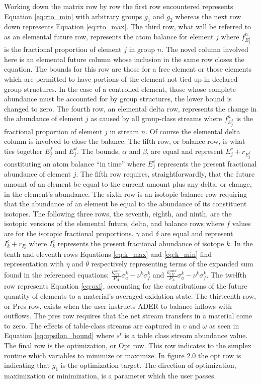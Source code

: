 Working down the matrix row by row the first row encountered represents 
Equation \ref{eq:rto_min} with arbitrary groups $g_{1}$ and $g_{2}$ whereas 
the next row 
down represents Equation \ref{eq:rto_max}. The third row, what will be referred
to as an elemental future row, represents the atom balance for element $j$ where
$f^{n}_{E_{j}^{f}}$ is the fractional proportion of element $j$ in group $n$.
The novel column involved here is an elemental future column whose inclusion
in the same row closes the equation.  
The bounds for this row are those for a
free element or those elements which are permitted to have portions
of the element not tied up in declared group structures. In the case of a
controlled element, those whose complete abundance must be accounted for by
group structures, the lower bound is changed to zero. 
The fourth row, an elemental
delta row, represents the change in the abundance of element $j$
as caused by all group-class streams where
$f^{n}_{E_{j}^{f}}$ is the fractional proportion of element $j$ in stream $n$. 
Of course the elemental delta column 
is involved to close the balance. The fifth row, or balance row, is what ties
together $E_{j}^{f}$ and $E_{j}^{d}$. The bounds, $\alpha$ and $\beta$,
are equal and represent $E_{j}^{c} + r_{E_{j}^{f}}$ constituting an atom
balance ``in time'' where $E_{j}^{c}$ represents the present fractional
abundance of element $j$. The fifth row requires, straightforwardly, that the
future amount of an element be equal to the current amount plus any delta,
or change, in the element's abundance. The sixth row is an isotopic balance row
requiring that the abundance of an element be equal to the abundance of its
constituent isotopes. 
The following three rows, the seventh, eighth, and ninth,
are the isotopic versions of the elemental future, delta, and balance rows 
where $f$ values
are for the isotopic fractional proportions.
$\gamma$ and $\delta$ are
equal and represent $I_{k}^{c} + r_{I_{k}^{c}}$ where $I_{k}^{c}$ represents
the present fractional abundance of isotope $k$. In the tenth and eleventh rows
Equations \ref{eq:k_max} and \ref{eq:k_min} find representation with $\eta$
and $\theta$ respectively representing terms of the expanded sum found in the
referenced equations; $\frac{k_{eff}^{min}}{P_{A}} \sigma_{a}^{k} - \nu^{k}
\sigma_{f}^{k}$ and
$\frac{k_{eff}^{max}}{P_{A}} \sigma_{a}^{k} - \nu^{k}
\sigma_{f}^{k}$. 
The twelfth row represents Equation \ref{eq:oxi}, accounting for the
contributions of the future quantity of elements to a material's averaged
oxidation state.
The thirteenth row, or Pres row, exists
when the user instructs ADER to balance inflows with outflows. The
pres row requires that the net stream transfers in a material come to zero. The
effects of table-class streams are captured in $\upsilon$ and $\omega$ as seen
in Equation \ref{eq:upsilon_bound} where $s^{t}$ is a table class stream 
abundance value. The final row is the optimization, or Opt row. This row
indicates to the simplex routine which variables to minimize or maximize. In
figure 2.0 the opt row is indicating that $g_{1}$ is the
optimization target. The direction of optimization, maximization or
minimization, is a parameter which the user passes.
    
